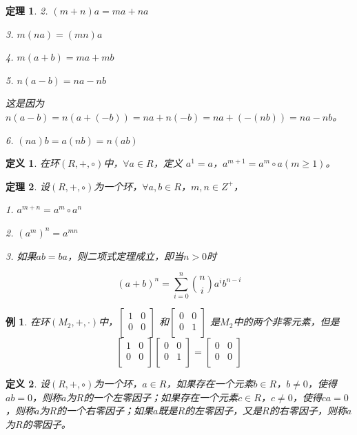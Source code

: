 \documentclass{article}
\newtheorem{Def}{定义}
\newtheorem{Thm}{定理}
\newtheorem*{Example}{例}
\begin{document}
\begin{CJK*}{UTF8}{gbsn}
\begin{Thm}
  2. $(m+n)a=ma + na$

  3. $m(na)=(mn)a$

  4. $m(a+b) = ma + mb$

  5. $n(a-b) = na - nb$

  这是因为$n(a-b)=n(a+(-b))=na+n(-b)=na+(-(nb))=na-nb$。

  6. $(na)b=a(nb)=n(ab)$

  
\end{Thm}

\begin{Def}
  在环$(R,+,\circ)$中，$\forall a\in R$，定义
  $a^1=a$，$a^{m+1}=a^m\circ a(m\geq 1)$。
\end{Def}

\begin{Thm}
  设$(R,+,\circ)$为一个环，$\forall a,b \in R$，$m, n \in Z^+$，

  1. $a^{m+n}=a^m \circ a^n$

  2. $(a^{m})^n=a^{mn}$

  3. 如果$ab=ba$，则二项式定理成立，即当$n>0$时

  \[(a+b)^n=\sum_{i=0}^{n}\binom{n}{i}a^ib^{n-i}\]
\end{Thm}

\begin{Example}
  在环$(M_2,+,\cdot)$中，$\begin{bmatrix}
    1&0\\
    0&0\\
  \end{bmatrix}$
  和$\begin{bmatrix}
    0&0\\
    0&1\\
  \end{bmatrix}$
  是$M_2$中的两个非零元素，但是\[\begin{bmatrix}
    1&0\\
    0&0\\
  \end{bmatrix}\begin{bmatrix}
    0&0\\
    0&1\\
  \end{bmatrix}=\begin{bmatrix}
    0&0\\
    0&0\\
  \end{bmatrix}\]
\end{Example}

\begin{Def}
  设$(R,+,\circ)$为一个环，$a\in R$，如果存在一个元素$b\in R$，$b\neq 0$，使得$ab=0$，则称$a$为$R$的一个左零因子；如果存在一个元素$c\in R$，$c\neq 0$，使得$ca=0$，则称$a$为$R$的一个右零因子；如果$a$既是$R$的左零因子，又是$R$的右零因子，则称$a$为$R$的零因子。
\end{Def}


\end{CJK*}
\end{document}
